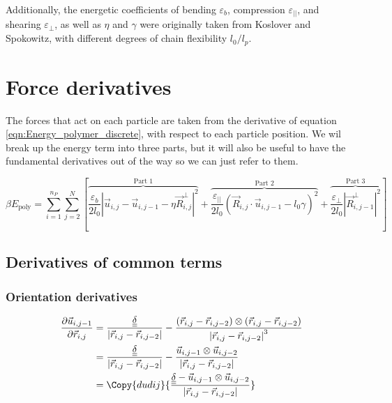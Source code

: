 \documentclass{article}
\renewcommand{\ij}{_{i,j}}
\newcommand{\ijj}{_{i,j-1}}
\newcommand{\ijk}{_{i,j-2}}
\newcommand{\ijjj}{_{i,j-2}}
\newcommand{\magn}[1]{\left\vert #1 \right\vert }
\renewcommand{\part}[2]{\frac{\partial #1 }{\partial #2}}
\newcommand{\ten}[1]{\underline{\underline{#1}}}
\newcommand{\rij}{\vec{r} \ij}
\newcommand{\rijjj}{\vec{r} \ijjj}
\newcommand{\rijk}{\vec{r} \ijk}
\newcommand{\uijj}{\vec{u} \ijj}
\newcommand{\uijjj}{\vec{u} \ijjj}
\begin{document}
\noindent
Additionally, the energetic coefficients of bending $\varepsilon_b$,
compression $\varepsilon_{\vert \vert}$, and shearing $\varepsilon_\perp$, as
well as $\eta$ and $\gamma$ were originally taken from Koslover and Spokowitz, with
different degrees of chain flexibility \(l_0/l_p\).


\section{Force derivatives}

The forces that act on each particle are taken from the derivative of equation
\ref{eqn:Energy_polymer_discrete}, with respect to each particle position. We
wil break up the energy term into three parts, but it will also be useful to have the fundamental derivatives out of the way so we can just refer to them.

\begin{equation}
  \label{eqn:Energy_polymer_broken}
  \beta E_{\text{poly}}  =  \sum_{i=1}^{n_P}  \sum_{j=2}^{N} \left[
  \overbrace{\frac{\varepsilon_b}{2 l_0}  
  \magn{ \vec{u} \ij - \vec{u} \ijj - \eta \vec{R}\ij ^\bot} ^2}^{\text{Part 1}} 
  +
  \overbrace{
   \frac{\varepsilon_{\vert \vert}}{2 l_0} 
   \left( \vec{R}\ij \cdot \vec{u} \ijj - l_0 \gamma \right)^2 }
   ^{\text{Part 2}}
   +
   \overbrace{\frac{\varepsilon _\perp}
   {2l_0} \magn{\vec{R}\ijj ^\perp}^2} ^ {\text{Part 3}}
  \right]
\end{equation}

\subsection{Derivatives of common terms}
\subsubsection{Orientation derivatives}

\begin{align*}
  \part{\vec{u} \ijj }{\vec{r} \ij} 
  &= \frac{\ten{\delta }}{\magn{\vec{r} \ij - \vec{r} \ijjj}} - 
  \frac{
    \left(\rij - \rijk \right)\otimes 
  \left(\rij - \rijk \right)
  }{
    \magn{\rij - \rijjj } ^3
    }
  \\
  &
  =
  \frac{\ten{\delta}}{\magn{\rij - \rijjj}} 
  -
  \frac{\uijj \otimes \uijjj}{\magn{\rij - \rijjj}}\\
  &  =
  \Copy{dudij}
  {
  \frac{\ten{\delta} - \uijj \otimes \uijjj}{\magn{\rij - \rijjj}}
  }
\end{align*}
\end{document}
